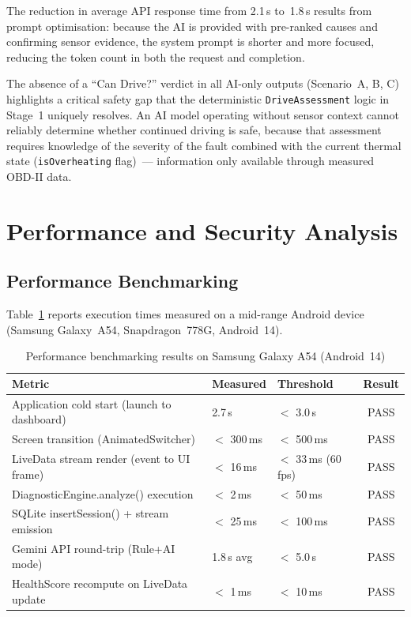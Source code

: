 The reduction in average API response time from 2.1\,s to~1.8\,s results from prompt optimisation: because the AI is provided with pre-ranked causes and confirming sensor evidence, the system prompt is shorter and more focused, reducing the token count in both the request and completion.

The absence of a ``Can Drive?'' verdict in all AI-only outputs (Scenario~A, B, C) highlights a critical safety gap that the deterministic \texttt{DriveAssessment} logic in Stage~1 uniquely resolves.
An AI model operating without sensor context cannot reliably determine whether continued driving is safe, because that assessment requires knowledge of the severity of the fault combined with the current thermal state (\texttt{isOverheating} flag)~--- information only available through measured OBD-II data.

\section{Performance and Security Analysis}
\label{sec:performance}

\subsection{Performance Benchmarking}

Table~\ref{tab:performance} reports execution times measured on a mid-range Android device (Samsung Galaxy~A54, Snapdragon~778G, Android~14).

\begin{table}[!htbp]
\centering
\caption{Performance benchmarking results on Samsung Galaxy A54 (Android~14)}
\label{tab:performance}
\begin{tabularx}{0.95\linewidth}{p{6.0cm} p{2.4cm} p{2.4cm} c}
\toprule
\rowcolor{tblhdr}
\color{white}\textbf{Metric} &
\color{white}\textbf{Measured} &
\color{white}\textbf{Threshold} &
\color{white}\textbf{Result} \\
\midrule
Application cold start (launch to dashboard)    & 2.7\,s        & $<$ 3.0\,s         & PASS \\
Screen transition (AnimatedSwitcher)            & $<$ 300\,ms   & $<$ 500\,ms        & PASS \\
LiveData stream render (event to UI frame)      & $<$ 16\,ms    & $<$ 33\,ms (60\,fps) & PASS \\
DiagnosticEngine.analyze() execution           & $<$ 2\,ms     & $<$ 50\,ms         & PASS \\
SQLite insertSession() + stream emission        & $<$ 25\,ms    & $<$ 100\,ms        & PASS \\
Gemini API round-trip (Rule+AI mode)            & 1.8\,s avg    & $<$ 5.0\,s         & PASS \\
HealthScore recompute on LiveData update        & $<$ 1\,ms     & $<$ 10\,ms         & PASS \\
\bottomrule
\end{tabularx}
\end{table}

